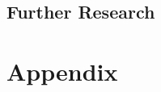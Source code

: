 \documentclass[11pt, a4paper, english]{book}
\begin{document}

\section{Further Research}


\pagebreak



\appendix
\chapter{Appendix}

\end{document}
